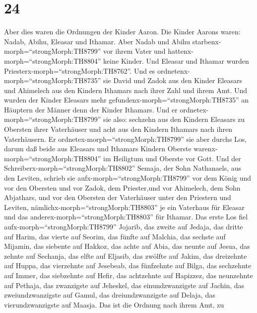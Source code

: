 \hypertarget{section-23}{%
\section{24}\label{section-23}}

 Aber dies waren die Ordnungen der Kinder Aaron. Die Kinder
Aarons waren: Nadab, Abihu, Eleasar und Ithamar.  Aber Nadab
und Abihu starbenx-morph=``strongMorph:TH8799'' vor ihrem Vater und
hattenx-morph=``strongMorph:TH8804'' keine Kinder. Und Eleasar und
Ithamar wurden Priesterx-morph=``strongMorph:TH8762''.  Und
es ordnetenx-morph=``strongMorph:TH8735'' sie David und Zadok aus den
Kinder Eleasars und Ahimelech aus den Kindern Ithamars nach ihrer Zahl
und ihrem Amt.  Und wurden der Kinder Eleasars mehr
gefundenx-morph=``strongMorph:TH8735'' an Häuptern der Männer denn der
Kinder Ithamars. Und er ordnetex-morph=``strongMorph:TH8799'' sie also:
sechzehn aus den Kindern Eleasars zu Obersten ihrer Vaterhäuser und acht
aus den Kindern Ithamars nach ihren Vaterhäusern.  Er
ordnetex-morph=``strongMorph:TH8799'' sie aber durchs Los, darum daß
beide aus Eleasars und Ithamars Kindern Oberste
warenx-morph=``strongMorph:TH8804'' im Heiligtum und Oberste vor Gott.
 Und der Schreiberx-morph=``strongMorph:TH8802'' Semaja, der
Sohn Nathanaels, aus den Leviten, schrieb sie
aufx-morph=``strongMorph:TH8799'' vor dem König und vor den Obersten und
vor Zadok, dem Priester,und vor Ahimelech, dem Sohn Abjathars, und vor
den Obersten der Vaterhäuser unter den Priestern und Leviten,
nämlichx-morph=``strongMorph:TH8803'' je ein Vaterhaus für Eleasar und
das anderex-morph=``strongMorph:TH8803'' für Ithamar.  Das
erste Los fiel aufx-morph=``strongMorph:TH8799'' Jojarib, das zweite auf
Jedaja,  das dritte auf Harim, das vierte auf Seorim,
 das fünfte auf Malchia, das sechste auf Mijamin,
 das siebente auf Hakkoz, das achte auf Abia, 
das neunte auf Jesua, das zehnte auf Sechanja,  das elfte
auf Eljasib, das zwölfte auf Jakim,  das dreizehnte auf
Huppa, das vierzehnte auf Jesebeab,  das fünfzehnte auf
Bilga, das sechzehnte auf Immer,  das siebzehnte auf Hefir,
das achtzehnte auf Hapizzez,  das neunzehnte auf Pethaja,
das zwanzigste auf Jeheskel,  das einundzwanzigste auf
Jachin, das zweiundzwanzigste auf Gamul,  das
dreiundzwanzigste auf Delaja, das vierundzwanzigste auf Maasja.
 Das ist die Ordnung nach ihrem Amt, zu
